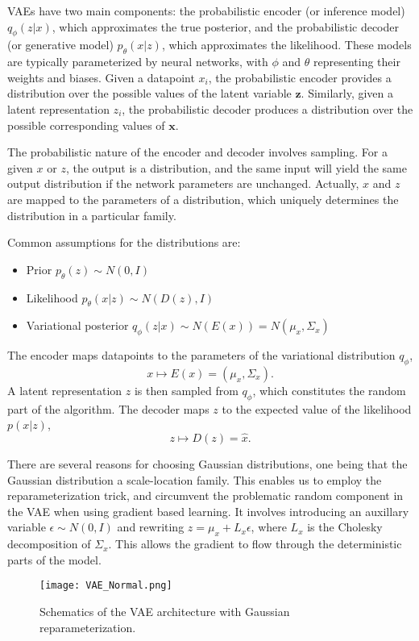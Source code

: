 \documentclass[../../thesis.tex]{subfiles}
\begin{document}
VAEs have two main components: the probabilistic encoder (or inference model) $q_\phi(z|x)$, which approximates the true posterior, and the probabilistic decoder (or generative model) $p_\theta(x|z)$, which approximates the likelihood. These models are typically parameterized by neural networks, with $\phi$ and $\theta$ representing their weights and biases. Given a datapoint $x_i$, the probabilistic encoder provides a distribution over the possible values of the latent variable $\mathbf{z}$. Similarly, given a latent representation $z_i$, the probabilistic decoder produces a distribution over the possible corresponding values of $\mathbf{x}$. \newline

The probabilistic nature of the encoder and decoder involves sampling. For a given $x$ or $z$, the output is a distribution, and the same input will yield the same output distribution if the network parameters are unchanged. Actually, $x$ and $z$ are mapped to the parameters of a distribution, which uniquely determines the distribution in a particular family.\newline

Common assumptions for the distributions are:
\begin{itemize}
    \item Prior $p_\theta(z)\sim N(0,I)$
    \item Likelihood $p_\theta(x|z)\sim N(D(z), I)$
    \item Variational posterior $q_\phi(z|x)\sim N(E(x)) = N(\mu_x, \Sigma_x)$
\end{itemize}
The encoder maps datapoints to the parameters of the variational distribution $q_\phi$, 
$$x \mapsto E(x) = (\mu_x, \Sigma_x).$$ 
A latent representation $z$ is then sampled from $q_\phi$, which constitutes the random part of the algorithm. The decoder maps $z$ to the expected value of the likelihood $p(x|z)$, 
$$z \mapsto D(z) = \widehat{x}.$$ 

There are several reasons for choosing Gaussian distributions, one being that the Gaussian distribution a scale-location family. This enables us to employ the reparameterization trick, and circumvent the problematic random component in the VAE when using gradient based learning. It involves introducing an auxillary variable $\epsilon \sim N(0,I)$ and rewriting $z = \mu_x + L_x\epsilon $, where $L_x$ is the Cholesky decomposition of $\Sigma_x$. This allows the gradient to flow through the deterministic parts of the model.
\begin{figure}[h]
    \texttt{[image: VAE\_Normal.png]}
    \centering
    \caption{Schematics of the VAE architecture with Gaussian reparameterization.}
    \label{fig:VAE_Normal}
\end{figure}
\end{document}
